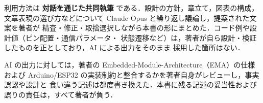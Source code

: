 \documentclass[lualatex,book,paper=a4paper,jafontsize=11.5pt,jafontscale=1.05]{jlreq}
\begin{document}
利用方法は \textbf{対話を通じた共同執筆} である．設計の方針，章立て，図表の構成，
文章表現の選び方などについて Claude Opus と繰り返し議論し，提案された文案を著者が
精査・修正・取捨選択しながら本書の形にまとめた．コード例や設計値（ピン配置・通信パラメータ・
状態遷移など）は，著者が自ら設計・検証したものを正としており，AI による出力をそのまま
採用した箇所はない．

AI の出力に対しては，著者の Embedded-Module-Architecture（EMA）の仕様および
Arduino/ESP32 の実装制約と整合するかを著者自身がレビューし，事実誤認や設計と
食い違う記述は都度書き換えた．本書に残る記述の妥当性および誤りの責任は，すべて著者が負う．
\end{document}
